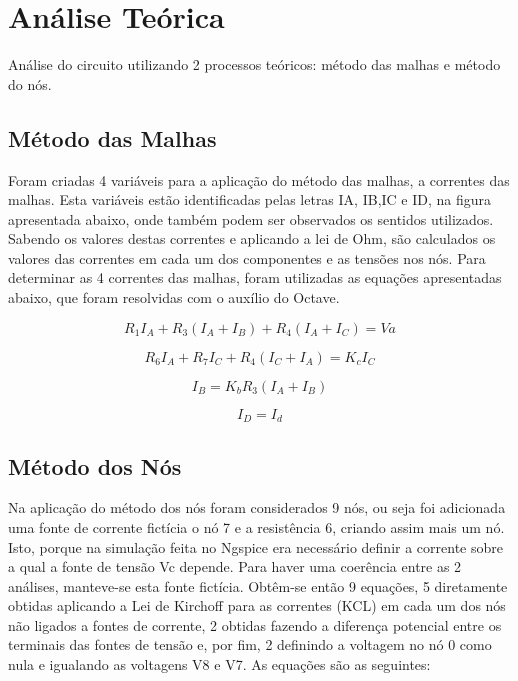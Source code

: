 \section{Análise Teórica}
\label{sec:analise_teorica}
Análise do circuito utilizando 2 processos teóricos: método das malhas e método do nós.
\subsection{Método das Malhas} 

Foram criadas 4 variáveis para a aplicação do método das malhas, a correntes das malhas. Esta variáveis estão identificadas pelas letras IA, IB,IC e ID, na figura apresentada abaixo, onde também podem ser observados os sentidos utilizados. Sabendo os valores destas correntes e aplicando a lei de Ohm, são calculados os valores das correntes em cada um dos componentes e as tensões nos nós. Para determinar as 4 correntes das malhas, foram utilizadas as equações apresentadas abaixo, que foram resolvidas com o auxílio do Octave. 

\begin {equation}
	R_1I_A + R_3(I_A+I_B) + R_4(I_A+I_C) = Va
	\label{eq:malha1}
\end{equation}

\begin {equation}
	R_6I_A + R_7I_C + R_4(I_C+I_A) = K_cI_C
	\label{eq:malha2}
\end{equation}

\begin {equation}
	I_B = K_bR_3(I_A+I_B)
	\label{eq:malha3}
\end{equation}

\begin {equation}
	I_D = I_d
	\label{eq:malha4}
\end{equation}


\subsection{Método dos Nós} 

Na aplicação do método dos nós foram considerados 9 nós, ou seja foi adicionada uma fonte de corrente fictícia o nó 7 e a resistência 6, criando assim mais um nó. Isto, porque na simulação feita no Ngspice era necessário definir a corrente sobre a qual a fonte de tensão Vc depende. Para haver uma coerência entre as 2 análises, manteve-se esta fonte fictícia. Obtêm-se então 9 equações, 5 diretamente obtidas aplicando a Lei de Kirchoff para as correntes (KCL) em cada um dos nós não ligados a fontes de corrente, 2 obtidas fazendo a diferença potencial entre os terminais das fontes de tensão e, por fim, 2 definindo a voltagem no nó 0 como nula e igualando as voltagens V8 e V7. As equações são as seguintes:\par


